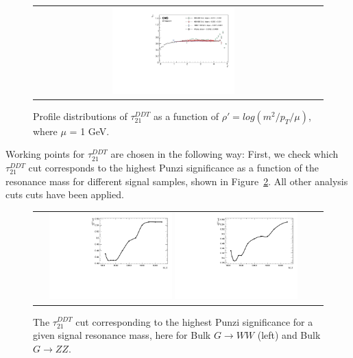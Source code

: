\begin{figure}[htbp]
\centering
\begin{tabular}{cc}
\includegraphics[width=0.45\textwidth]{figures/analysis/search3/AN-17-303/vtag/rho_pythia_FullSel_rhoPrimeClosure.pdf}
\end{tabular}
\caption{Profile distributions of $\tau_{21}^{DDT}$ as a function of $\rho' = log(m^2/p_T/\mu)$, where $\mu$ = 1 GeV.}
\label{fig:rhoClosure}
\end{figure}
Working points for $\tau_{21}^{DDT}$ are chosen in the following way: First, we check which $\tau_{21}^{DDT}$ cut corresponds to the highest Punzi significance as a function of the resonance mass for different signal samples, shown in Figure~\ref{fig:punzi}. All other analysis cuts cuts have been applied.
\begin{figure}[htbp]
\centering
\begin{tabular}{cc}
\includegraphics[width=0.45\textwidth]{figures/analysis/search3/AN-17-303/vtag/tau21ddt_punzi_BulkGravToZZToZhadZhad.pdf}
\includegraphics[width=0.45\textwidth]{figures/analysis/search3/AN-17-303/vtag/tau21ddt_punzi_BulkGravToWW.pdf}
\end{tabular}
\caption{The $\tau_{21}^{DDT}$ cut corresponding to the highest Punzi significance for a given signal resonance mass, here for Bulk $G\rightarrow WW$ (left) and Bulk $G\rightarrow ZZ$.}
\label{fig:punzi}
\end{figure}
